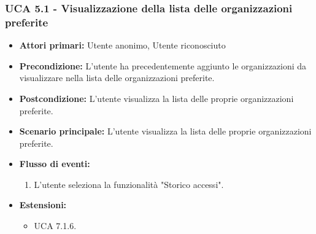 \subsubsection{UCA 5.1 - Visualizzazione della lista delle organizzazioni preferite}
\begin{itemize}
    \item \textbf{Attori primari:} Utente anonimo, Utente riconosciuto
    \item \textbf{Precondizione:} L'utente ha precedentemente aggiunto le organizzazioni da visualizzare nella lista delle organizzazioni preferite.
    \item \textbf{Postcondizione:} L'utente visualizza la lista delle proprie organizzazioni preferite.
    \item \textbf{Scenario principale:} L'utente visualizza la lista delle proprie organizzazioni preferite.
    \item \textbf{Flusso di eventi:}
    \begin{enumerate}
        \item L'utente seleziona la funzionalità "Storico accessi".
    \end{enumerate}
    \item \textbf{Estensioni:}
    \begin{itemize}
        \item UCA 7.1.6.
    \end{itemize}
\end{itemize}

